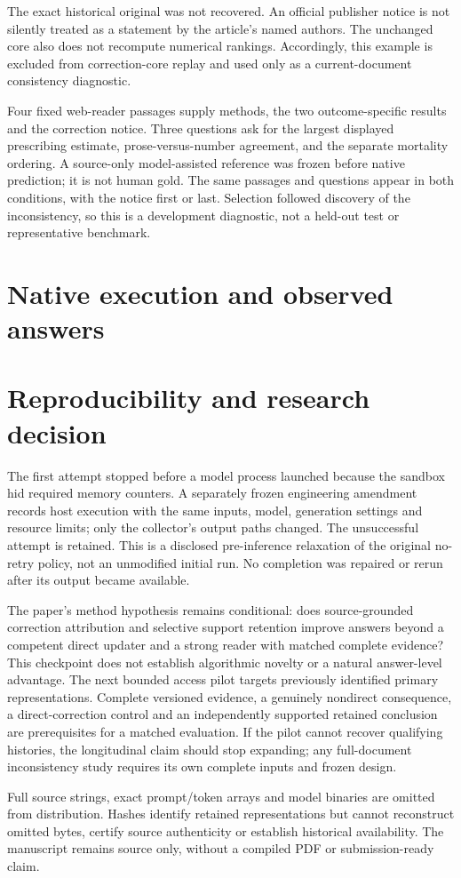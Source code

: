 \documentclass[11pt]{article}
\begin{document}
The exact historical original was not recovered. An official publisher notice is not silently treated as a statement by the article's named authors. The unchanged core also does not recompute numerical rankings. Accordingly, this example is excluded from correction-core replay and used only as a current-document consistency diagnostic.

Four fixed web-reader passages supply methods, the two outcome-specific results and the correction notice. Three questions ask for the largest displayed prescribing estimate, prose-versus-number agreement, and the separate mortality ordering. A source-only model-assisted reference was frozen before native prediction; it is not human gold. The same passages and questions appear in both conditions, with the notice first or last. Selection followed discovery of the inconsistency, so this is a development diagnostic, not a held-out test or representative benchmark.

\section{Native execution and observed answers}\label{sec:v11execution}


\section{Reproducibility and research decision}\label{sec:v11decision}
The first attempt stopped before a model process launched because the sandbox hid required memory counters. A separately frozen engineering amendment records host execution with the same inputs, model, generation settings and resource limits; only the collector's output paths changed. The unsuccessful attempt is retained. This is a disclosed pre-inference relaxation of the original no-retry policy, not an unmodified initial run. No completion was repaired or rerun after its output became available.

The paper's method hypothesis remains conditional: does source-grounded correction attribution and selective support retention improve answers beyond a competent direct updater and a strong reader with matched complete evidence? This checkpoint does not establish algorithmic novelty or a natural answer-level advantage. The next bounded access pilot targets previously identified primary representations. Complete versioned evidence, a genuinely nondirect consequence, a direct-correction control and an independently supported retained conclusion are prerequisites for a matched evaluation. If the pilot cannot recover qualifying histories, the longitudinal claim should stop expanding; any full-document inconsistency study requires its own complete inputs and frozen design.

Full source strings, exact prompt/token arrays and model binaries are omitted from distribution. Hashes identify retained representations but cannot reconstruct omitted bytes, certify source authenticity or establish historical availability. The manuscript remains source only, without a compiled PDF or submission-ready claim.
\end{document}
